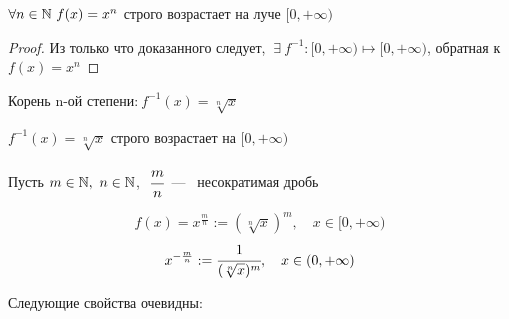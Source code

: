 \begin{lemma}
    $\forall n\in \mathbb{N} \ f(x) = x^{n}$ строго возрастает на луче $[0, +\infty)$
\end{lemma}
\begin{proof}
    Из только что доказанного следует, $
    \ \exists \  f^{-1}: [0, +\infty) \mapsto [0, +\infty)
    $, обратная к $f(x) = x^{n}$
\end{proof}

\begin{definition}
    Корень n-ой степени:$ \ 
    f^{-1}(x) = \sqrt[n]{x}$
\end{definition}

$
    f^{-1}(x) = \sqrt[n]{x}
    $ строго возрастает на $[0, +\infty)$

    Пусть $m \in \mathbb{N}, \ n \in \mathbb{N}$, $\ \cfrac{m}{n}$~---~ несократимая дробь

    $$f(x) = x^{\frac{m}{n}} := (\sqrt[n]{x})^{m}, \quad x\in [0,+\infty)$$
    $$x^{-\frac{m}{n}} := \cfrac{1}{(\sqrt[n]{x})^{m}}, \quad x\in (0,+\infty)$$

    Следующие свойства очевидны:

